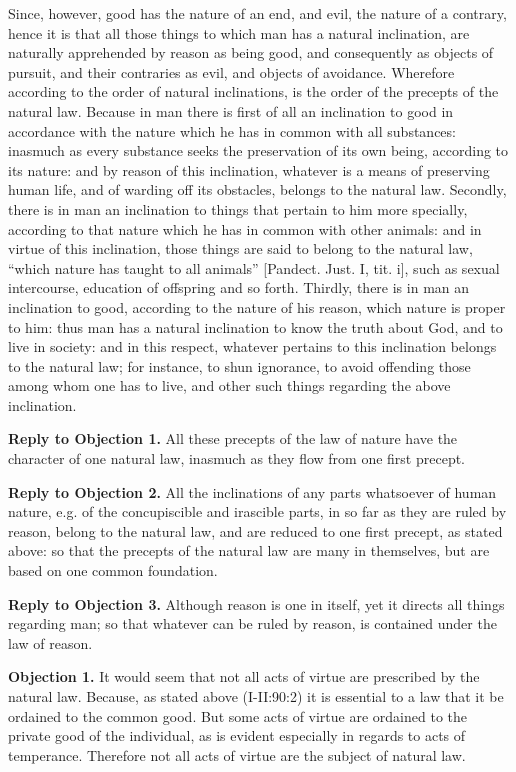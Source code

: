 Since, however, good has the nature of an end, and evil, the nature of a contrary, hence it is that all those things to which man has a natural inclination, are naturally apprehended by reason as being good, and consequently as objects of pursuit, and their contraries as evil, and objects of avoidance. Wherefore according to the order of natural inclinations, is the order of the precepts of the natural law. Because in man there is first of all an inclination to good in accordance with the nature which he has in common with all substances: inasmuch as every substance seeks the preservation of its own being, according to its nature: and by reason of this inclination, whatever is a means of preserving human life, and of warding off its obstacles, belongs to the natural law. Secondly, there is in man an inclination to things that pertain to him more specially, according to that nature which he has in common with other animals: and in virtue of this inclination, those things are said to belong to the natural law, ``which nature has taught to all animals'' [Pandect. Just. I, tit. i], such as sexual intercourse, education of offspring and so forth. Thirdly, there is in man an inclination to good, according to the nature of his reason, which nature is proper to him: thus man has a natural inclination to know the truth about God, and to live in society: and in this respect, whatever pertains to this inclination belongs to the natural law; for instance, to shun ignorance, to avoid offending those among whom one has to live, and other such things regarding the above inclination.

\textbf{Reply to Objection 1.} All these precepts of the law of nature have the character of one natural law, inasmuch as they flow from one first precept.

\textbf{Reply to Objection 2.} All the inclinations of any parts whatsoever of human nature, e.g. of the concupiscible and irascible parts, in so far as they are ruled by reason, belong to the natural law, and are reduced to one first precept, as stated above: so that the precepts of the natural law are many in themselves, but are based on one common foundation.

\textbf{Reply to Objection 3.} Although reason is one in itself, yet it directs all things regarding man; so that whatever can be ruled by reason, is contained under the law of reason.


\textbf{Objection 1.} It would seem that not all acts of virtue are prescribed by the natural law. Because, as stated above (I-II:90:2) it is essential to a law that it be ordained to the common good. But some acts of virtue are ordained to the private good of the individual, as is evident especially in regards to acts of temperance. Therefore not all acts of virtue are the subject of natural law.

